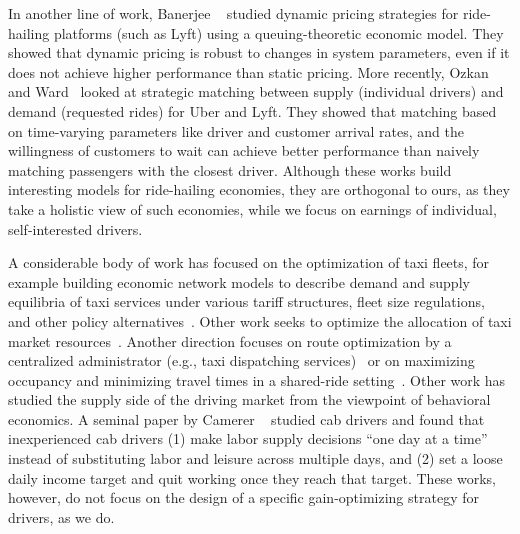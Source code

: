  In another line of work, Banerjee {\etal}~\cite{banerjee2015pricing} studied  
 dynamic
pricing strategies for ride-hailing platforms (such as Lyft) using a 
queuing-theoretic economic model. 
They showed that dynamic pricing is robust to changes in system parameters, even if it does not 
  achieve higher performance than static pricing.  
More recently, Ozkan and Ward~\cite{ozkan2016dynamic} looked at strategic matching between supply (individual drivers) 
  and demand (requested rides) for Uber and Lyft.
They showed that matching based on time-varying parameters like driver and customer arrival rates,  and the
willingness of customers to wait can achieve better performance than naively matching 
passengers with the closest driver. 
Although these works build interesting models for ride-hailing economies, they are
orthogonal to ours, as they take a holistic view of such economies, while we focus 
 on earnings of individual, self-interested drivers.




A considerable body of work has focused on the optimization of taxi fleets, for
example building economic network models to describe demand and supply equilibria of taxi 
services under various tariff structures, fleet size regulations, and other policy
alternatives~\cite{bailey1987simulation,yang2002demand}.  Other work seeks to 
 optimize the allocation of taxi market resources~\cite{shi2016optimization}.
Another direction focuses on route optimization by a centralized administrator (e.g., taxi dispatching services)~\cite{maciejewski2013simulation,nunes2011taxi} 
or on maximizing occupancy and minimizing travel times 
in a shared-ride setting~\cite{jung2013design}.
Other work has studied the supply side of the driving market from the viewpoint of behavioral economics.
A seminal paper by Camerer {\etal}~\cite{camerer1997labor} studied cab drivers and found that  inexperienced
cab drivers (1) make labor supply decisions ``one day at a time'' instead of substituting labor and leisure across multiple days, and  (2) set a loose daily income target and quit working once they reach that target.  
These works, however, do not focus on the design of a specific gain-optimizing
strategy for drivers, as we do.

